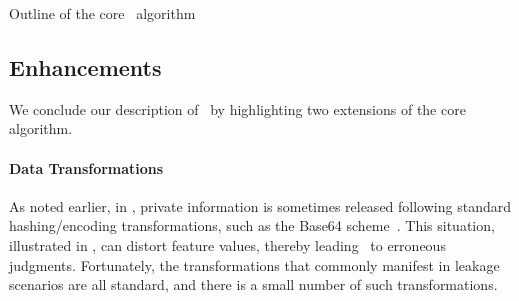 \begin{algorithm}[t]
\begin{small}
\DontPrintSemicolon
{}
\;
\end{small}
\caption{\label{Al:featureAlg}Outline of the core \Tool\ algorithm}
\end{algorithm}

\subsection{Enhancements}\label{Se:points}

We conclude our description of \Tool\ by highlighting two extensions of the core algorithm.

\paragraph{Data Transformations} As noted earlier, in , private information is sometimes released following standard hashing/encoding transformations, such as the Base64 scheme~\cite{HHJSW:CCS11}. This situation, illustrated in , can distort feature values, thereby leading \Tool\ to erroneous judgments. Fortunately, the transformations that commonly manifest in leakage scenarios are all standard, and there is a small number of such transformations. 


